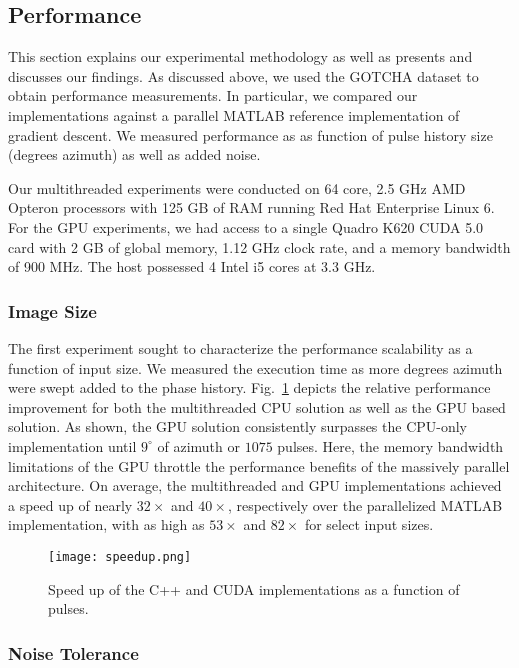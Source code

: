 \subsection{Performance}

This section explains our experimental methodology as well as presents and
discusses our findings. As discussed above, we used the GOTCHA dataset to
obtain performance measurements. In particular, we compared our implementations
against a parallel MATLAB reference implementation of gradient descent. We
measured performance as as function of pulse history size (degrees azimuth) as
well as added noise.

Our multithreaded experiments were conducted on 64 core, 2.5 GHz AMD Opteron
processors with 125 GB of RAM running Red Hat Enterprise Linux 6. For the GPU
experiments, we had access to a single Quadro K620 CUDA 5.0 card with 2 GB of
global memory, 1.12 GHz clock rate, and a memory bandwidth of 900 MHz. The host
possessed 4 Intel i5 cores at 3.3 GHz.

\subsubsection{Image Size}

The first experiment sought to characterize the performance scalability as a
function of input size. We measured the execution time as more degrees azimuth
were swept added to the phase history. Fig.~\ref{fig:speedup} depicts the
relative performance improvement for both the multithreaded CPU solution as well
as the GPU based solution. As shown, the GPU solution consistently surpasses the
CPU-only implementation until $9^{\circ}$ of azimuth or $1075$ pulses. Here, the
memory bandwidth limitations of the GPU throttle the performance benefits of the
massively parallel architecture. On average, the multithreaded and GPU
implementations achieved a speed up of nearly $32\times$ and $40\times$, respectively over
the parallelized MATLAB implementation, with as high as $53\times$ and $82\times$ for select
input sizes.

\begin{figure}
  \centering
  \texttt{[image: speedup.png]}
  \vspace{5 mm}
  \caption{Speed up of the C++ and CUDA implementations as a function of pulses.}
  \label{fig:speedup}
\end{figure}

\subsubsection{Noise Tolerance}

